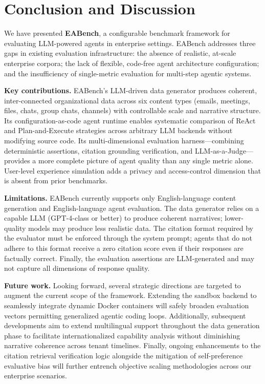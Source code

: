 \documentclass[journal,dvipsnames]{acmart}
\begin{document}
\section{Conclusion and Discussion}
\label{sec:conclusion}

We have presented \textbf{EABench}, a configurable benchmark framework for
evaluating LLM-powered agents in enterprise settings.  EABench addresses three
gaps in existing evaluation infrastructure: the absence of realistic, at-scale
enterprise corpora; the lack of flexible, code-free agent architecture
configuration; and the insufficiency of single-metric evaluation for multi-step
agentic systems.

\textbf{Key contributions.}
EABench's LLM-driven data generator produces coherent, inter-connected
organizational data across six content types (emails, meetings, files, chats,
group chats, channels) with controllable scale and narrative structure.  Its
configuration-as-code agent runtime enables systematic comparison of ReAct and
Plan-and-Execute strategies across arbitrary LLM backends without modifying
source code.  Its multi-dimensional evaluation harness---combining deterministic
assertions, citation grounding verification, and LLM-as-a-Judge---provides a
more complete picture of agent quality than any single metric alone.
User-level experience simulation adds a privacy and access-control dimension
that is absent from prior benchmarks.

\textbf{Limitations.}
EABench currently supports only English-language content generation and
English-language agent evaluation.  The data generator relies on a capable LLM
(GPT-4-class or better) to produce coherent narratives; lower-quality models
may produce less realistic data.  The citation format required by the evaluator
must be enforced through the system prompt; agents that do not adhere to this
format receive a zero citation score even if their responses are factually
correct.  Finally, the evaluation assertions are LLM-generated and may not
capture all dimensions of response quality.

\textbf{Future work.} Looking forward, several strategic directions are targeted to augment the current scope of the framework. Extending the sandbox backend to seamlessly integrate dynamic Docker containers will safely broaden evaluation vectors permitting generalized agentic coding loops. Additionally, subsequent developments aim to extend multilingual support throughout the data generation phase to facilitate internationalized capability analysis without diminishing narrative coherence across tenant timelines. Finally, ongoing enhancements to the citation retrieval verification logic alongside the mitigation of self-preference evaluative bias will further entrench objective scaling methodologies across our enterprise scenarios.
\end{document}
